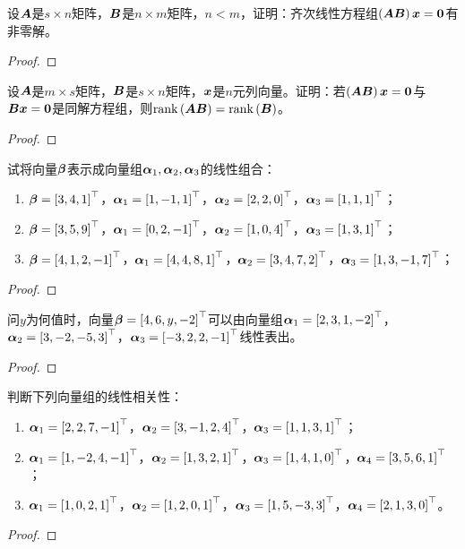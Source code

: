 \begin{problem}\label{problem-2.21}
设\(\mata\)是\(s\times n\)矩阵，\(\matb\)是\(n\times m\)矩阵，\(n<m\)，证明：齐次线性方程组\(\spar{\mata\matb}\vecx=\veczero\)有非零解。
\end{problem}
\begin{proof}
\end{proof}

\begin{problem}\label{problem-2.22}
设\(\mata\)是\(m\times s\)矩阵，\(\matb\)是\(s\times n\)矩阵，\(\vecx\)是\(n\)元列向量。证明：若\(\spar{\mata\matb}\vecx=\veczero\)与\(\matb\vecx=\veczero\)是同解方程组，则\(\rank{\mata\matb}=\rank{\matb}\)。
\end{problem}
\begin{proof}
\end{proof}

\begin{problem}\label{problem-2.23}
试将向量\(\vecbeta\)表示成向量组\(\vecal_1,\vecal_2,\vecal_3\)的线性组合：
\begin{enumerate}
    \item \(\vecbeta=\myvec{3,4,1}\)，\(\vecal_1=\myvec{1,-1,1}\)，\(\vecal_2=\myvec{2,2,0}\)，\(\vecal_3=\myvec{1,1,1}\)；
    \item \(\vecbeta=\myvec{3,5,9}\)，\(\vecal_1=\myvec{0,2,-1}\)，\(\vecal_2=\myvec{1,0,4}\)，\(\vecal_3=\myvec{1,3,1}\)；
    \item \(\vecbeta=\myvec{4,1,2,-1}\)，\(\vecal_1=\myvec{4,4,8,1}\)，\(\vecal_2=\myvec{3,4,7,2}\)，\(\vecal_3=\myvec{1,3,-1,7}\)；
\end{enumerate}
\end{problem}
\begin{proof}
\end{proof}

\begin{problem}\label{problem-2.24}
问\(y\)为何值时，向量\(\vecbeta=\myvec{4,6,y,-2}\)可以由向量组\(\vecal_1=\myvec{2,3,1,-2}\)，\(\vecal_2=\myvec{3,-2,-5,3}\)，\(\vecal_3=\myvec{-3,2,2,-1}\)线性表出。
\end{problem}
\begin{proof}
\end{proof}

\begin{problem}\label{problem-2.25}
判断下列向量组的线性相关性：
\begin{enumerate}
    \item \(\vecal_1=\myvec{2,2,7,-1}\)，\(\vecal_2=\myvec{3,-1,2,4}\)，\(\vecal_3=\myvec{1,1,3,1}\)；
    \item \(\vecal_1=\myvec{1,-2,4,-1}\)，\(\vecal_2=\myvec{1,3,2,1}\)，\(\vecal_3=\myvec{1,4,1,0}\)，\(\vecal_4=\myvec{3,5,6,1}\)；
    \item \(\vecal_1=\myvec{1,0,2,1}\)，\(\vecal_2=\myvec{1,2,0,1}\)，\(\vecal_3=\myvec{1,5,-3,3}\)，\(\vecal_4=\myvec{2,1,3,0}\)。
\end{enumerate}
\end{problem}
\begin{proof}
\end{proof}

